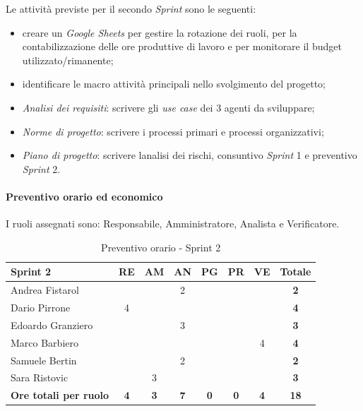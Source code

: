 \documentclass[12pt, a4paper]{article}
\begin{document}
{Le attività previste per il secondo \emph{Sprint} sono le seguenti:

\begin{itemize}
\item
  creare un \emph{Google Sheets} per gestire la rotazione dei ruoli, per
  la contabilizzazione delle ore produttive di lavoro e per monitorare
  il budget utilizzato/rimanente;
\item
  identificare le macro attività principali nello svolgimento del
  progetto;
\item
  \emph{Analisi dei requisiti}: scrivere gli \emph{use case} dei 3
  agenti da sviluppare;
\item
  \emph{Norme di progetto}: scrivere i processi primari e processi
  organizzativi;
\item
  \emph{Piano di progetto}: scrivere l\textquotesingle analisi dei
  rischi, consuntivo \emph{Sprint} 1 e preventivo \emph{Sprint} 2.
\end{itemize}

\paragraph{Preventivo orario ed
economico}\label{preventivo-orario-ed-economico-1}

I ruoli assegnati sono: Responsabile, Amministratore, Analista e
Verificatore.

\begin{table}[H]
    \centering
    \renewcommand{\arraystretch}{1.3}
    \begin{tabularx}{0.9\textwidth}{|X|c|c|c|c|c|c|c|}
        \hline
        \textbf{Sprint 2} & \textbf{RE} & \textbf{AM} & \textbf{AN} &
        \textbf{PG} & \textbf{PR} & \textbf{VE} & \textbf{Totale} \\ \hline
        Andrea Fistarol & & & 2 & & & &\textbf{2} \\ \hline
        Dario Pirrone & 4 & & & & & &\textbf{4} \\ \hline
        Edoardo Granziero & & & 3 & & & &\textbf{3} \\ \hline
        Marco Barbiero & & & & & & 4 &\textbf{4} \\ \hline
        Samuele Bertin & & & 2 & & & &\textbf{2} \\ \hline
        Sara Ristovic & & 3 & & & & &\textbf{3} \\ \hline
        \textbf{Ore totali per ruolo} & \textbf{4} & \textbf{3} &
        \textbf{7} & \textbf{0} & \textbf{0} & \textbf{4} & \textbf{18}\\ \hline
    \end{tabularx}
    \caption{Preventivo orario - Sprint 2}
\end{table}

}
\end{document}
